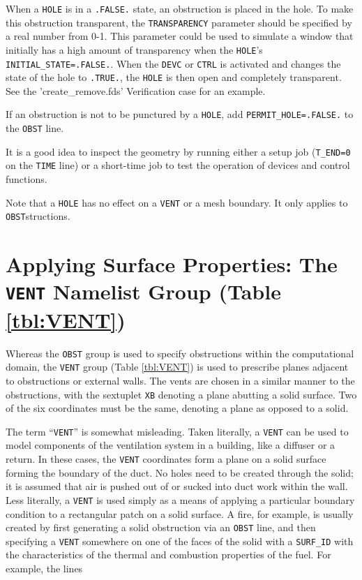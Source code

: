 \documentclass[11pt]{book}
\newcommand{\ct}{\tt\small}
\begin{document}
When a {\ct HOLE} is in a {\ct .FALSE.} state, an obstruction is placed in the hole.
To make this obstruction transparent, the {\ct TRANSPARENCY} parameter should be specified by
a real number from 0-1. This parameter could be used to simulate a window that initially has a high amount
of transparency when the {\ct HOLE}'s {\ct INITIAL\_STATE=.FALSE.}. When the {\ct DEVC} or {\ct CTRL}
is activated and changes the state of the hole to {\ct .TRUE.}, the {\ct HOLE} is then open and completely transparent.
See the 'create\_remove.fds' Verification case for an example.

If an obstruction is not to be punctured by a {\ct HOLE}, add
{\ct PERMIT\_HOLE=.FALSE.} to the {\ct OBST} line.

\begin{warning}
\noindent
It is a good idea to inspect the geometry by running either a setup job
({\ct T\_END=0} on the {\ct TIME} line) or a short-time job to test the operation of devices and control functions.
\end{warning}

\begin{warning}
\noindent
Note that a {\ct HOLE} has no effect on a {\ct VENT} or a mesh boundary. It only applies to {\ct OBST}structions.
\end{warning}



\section{Applying Surface Properties: The \texorpdfstring{{\tt VENT}}{VENT} Namelist Group (Table \ref{tbl:VENT})}
\label{info:VENT} 

Whereas the {\ct OBST} group is used to specify obstructions within the
computational domain, the {\ct VENT} group (Table \ref{tbl:VENT}) is used to prescribe planes
adjacent to obstructions or external walls. The vents are chosen in a
similar manner to the obstructions, with the sextuplet {\ct XB}
denoting a plane abutting a solid surface. Two of the six coordinates must
be the same, denoting a plane as opposed to a solid.

The term ``{\ct VENT}'' is somewhat misleading. Taken literally, a
{\ct VENT} can be used to model components of the ventilation system in
a building, like a diffuser or a return.
In these cases, the {\ct VENT} coordinates form a plane on a
solid surface forming the boundary of the duct.
No holes need to be created through the solid; it is
assumed that air is pushed out of or sucked into duct work within the
wall. Less literally, a {\ct VENT} is used simply as a means of applying
a particular boundary condition to a rectangular patch on a solid surface.
A fire, for example, is usually created by first generating a solid
obstruction via an {\ct OBST} line, and then specifying a {\ct VENT}
somewhere on one of the faces of the solid with a {\ct SURF\_ID}
with the characteristics of the thermal and combustion properties of the fuel.
For example, the lines
\end{document}
